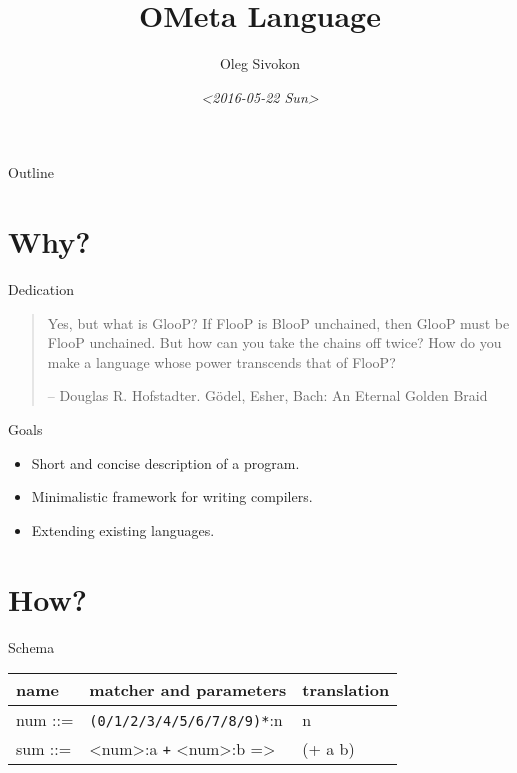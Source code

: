 \documentclass[presentation,10pt]{beamer}
\author{Oleg Sivokon}
\date{\textit{<2016-05-22 Sun>}}
\title{OMeta Language}
\begin{document}
\maketitle
\begin{frame}{Outline}
\tableofcontents
\end{frame}


\section{Why?}
\label{sec-1}

\begin{frame}[label=sec-1-1]{Dedication}
\begin{quote}
Yes, but what is GlooP? If FlooP is BlooP unchained, then GlooP must
be FlooP unchained. But how can you take the chains off twice? How
do you make a language whose power transcends that of FlooP?

-- \alert{Douglas R. Hofstadter. Gödel, Esher, Bach: An Eternal Golden Braid}
\end{quote}
\end{frame}

\begin{frame}[label=sec-1-2]{Goals}
\begin{itemize}
\item Short and concise description of a program.
\item Minimalistic framework for writing compilers.
\item Extending existing languages.
\end{itemize}
\end{frame}

\section{How?}
\label{sec-2}

\begin{frame}[fragile,label=sec-2-1]{Schema}
 \begin{center}
\begin{tabular}{lll}
name & matcher and parameters & translation\\
\hline
num ::= & \verb~(0/1/2/3/4/5/6/7/8/9)*~:n & n\\
sum ::= & <num>:a \verb~+~ <num>:b => & (+ a b)\\
\end{tabular}
\end{center}
\end{frame}
\end{document}
